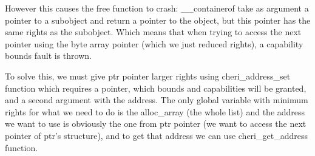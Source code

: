 \documentclass[a4paper, 11pt]{article}
\begin{document}
		However this causes the free function to crash: \_\_containerof take as argument a pointer to a subobject and return a pointer to the object, but this pointer has the same rights as the subobject.
		Which means that when trying to access the next pointer using the byte array pointer (which we just reduced rights), a capability bounds fault is thrown.
		

		To solve this, we must give ptr pointer larger rights using cheri\_address\_set function which requires a pointer, which bounds and capabilities will be granted, and a second argument with the address.
		The only global variable with minimum rights for what we need to do is the alloc\_array (the whole list) and the address we want to use is obviously the one from ptr pointer (we want to access the next pointer of ptr's structure), and to get that address we can use cheri\_get\_address function.
		\newcommand{\objstruct}[3]{
			\node[] at (#1+2.5, #2+1) {arg};
			\node[] at (#1+2.5, #2+3) {fn};
			\node[] at (#1+2.5, #2+4.5) {buf};
			\ifnum#3=1
			\draw (#1, #2) rectangle (#1+5, #2+5);
			\draw (#1, #2) rectangle (#1+5, #2+2);
			\draw (#1, #2) rectangle (#1+5, #2+4);
			\else
			\draw[dotted] (#1, #2) rectangle (#1+5, #2+5);
			\draw[dotted] (#1, #2) rectangle (#1+5, #2+2);
			\draw[dotted] (#1, #2) rectangle (#1+5, #2+4);
			\fi
		}
\end{document}
